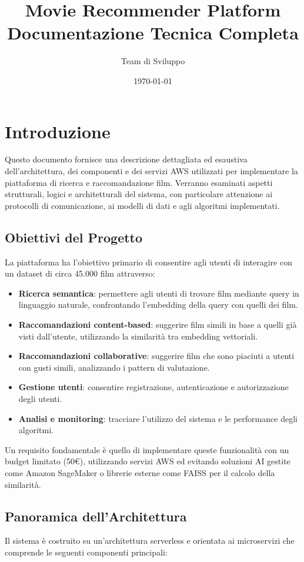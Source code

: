 \documentclass[11pt,a4paper]{article}
\title{\Huge Movie Recommender Platform\\[0.5cm] \Large Documentazione Tecnica Completa}
\author{Team di Sviluppo}
\date{\today}
\begin{document}
\maketitle
\tableofcontents
\newpage

\section{Introduzione}
Questo documento fornisce una descrizione dettagliata ed esaustiva dell'architettura, dei componenti e dei servizi AWS utilizzati per implementare la piattaforma di ricerca e raccomandazione film. Verranno esaminati aspetti strutturali, logici e architetturali del sistema, con particolare attenzione ai protocolli di comunicazione, ai modelli di dati e agli algoritmi implementati.

\subsection{Obiettivi del Progetto}
La piattaforma ha l'obiettivo primario di consentire agli utenti di interagire con un dataset di circa 45.000 film attraverso:

\begin{itemize}[itemsep=0.5em]
  \item \textbf{Ricerca semantica}: permettere agli utenti di trovare film mediante query in linguaggio naturale, confrontando l'embedding della query con quelli dei film.
  \item \textbf{Raccomandazioni content-based}: suggerire film simili in base a quelli già visti dall'utente, utilizzando la similarità tra embedding vettoriali.
  \item \textbf{Raccomandazioni collaborative}: suggerire film che sono piaciuti a utenti con gusti simili, analizzando i pattern di valutazione.
  \item \textbf{Gestione utenti}: consentire registrazione, autenticazione e autorizzazione degli utenti.
  \item \textbf{Analisi e monitoring}: tracciare l'utilizzo del sistema e le performance degli algoritmi.
\end{itemize}

Un requisito fondamentale è quello di implementare queste funzionalità con un budget limitato (50€), utilizzando servizi AWS ed evitando soluzioni AI gestite come Amazon SageMaker o librerie esterne come FAISS per il calcolo della similarità.

\subsection{Panoramica dell'Architettura}
Il sistema è costruito su un'architettura serverless e orientata ai microservizi che comprende le seguenti componenti principali:
\end{document}
